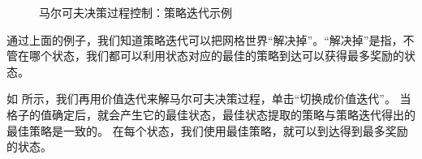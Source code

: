 \begin{figure}[h]
  \centering
  \caption{马尔可夫决策过程控制：策略迭代示例}
  \label{fig:}
\end{figure}

通过上面的例子，我们知道策略迭代可以把网格世界“解决掉”。“解决掉”是指，不管在哪个状态，我们都可以利用状态对应的最佳的策略到达可以获得最多奖励的状态。


如 所示，我们再用价值迭代来解马尔可夫决策过程，单击“切换成价值迭代”。 
当格子的值确定后，就会产生它的最佳状态，最佳状态提取的策略与策略迭代得出的最佳策略是一致的。
在每个状态，我们使用最佳策略，就可以到达得到最多奖励的状态。

